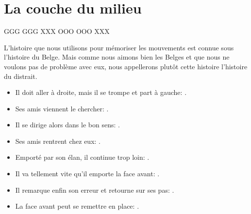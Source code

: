 \chapter{La couche du milieu}

{
	\centering
	\RubikFaceRight%
	{G}{G}{G}%
	{G}{G}{G}%
	{X}{X}{X}
	\RubikFaceFront%
	{O}{O}{O}%
	{O}{O}{O}%
	{X}{X}{X}
	\par
}

L'histoire que nous utilisons pour mémoriser les mouvements est connue sous \og l'histoire du Belge\fg{}. Mais comme nous aimons bien les Belges et que nous ne voulons pas de problème avec eux, nous appellerons plutôt cette histoire \og l'histoire du distrait\fg{}.

\begin{itemize}
	\item Il doit aller à droite, mais il se trompe et part à gauche: .
	\item Ses amis viennent le chercher: .
	\item Il se dirige alors dans le bon sens: .
	\item Ses amis rentrent chez eux: .
	\item Emporté par son élan, il continue trop loin: .
	\item Il va tellement vite qu'il emporte la face avant: .
	\item Il remarque enfin son erreur et retourne sur ses pas: .
	\item La face avant peut se remettre en place: .
	
\end{itemize}
